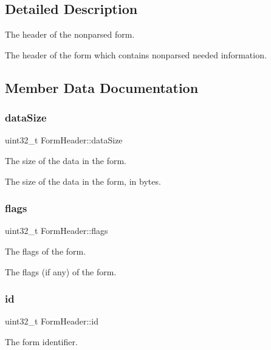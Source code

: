 \subsection{Detailed Description}
The header of the nonparsed form. 

The header of the form which contains nonparsed needed information. 

\subsection{Member Data Documentation}
\mbox{\label{struct_form_header_a39628718fdb8e8825236f8d435bb723a}} 
\subsubsection{\texorpdfstring{data\+Size}{dataSize}}
{\footnotesize\ttfamily uint32\+\_\+t Form\+Header\+::data\+Size}



The size of the data in the form. 

The size of the data in the form, in bytes. \mbox{\label{struct_form_header_afdbca03050703e03f70e073ad1fda83f}} 
\subsubsection{\texorpdfstring{flags}{flags}}
{\footnotesize\ttfamily uint32\+\_\+t Form\+Header\+::flags}



The flags of the form. 

The flags (if any) of the form. \mbox{\label{struct_form_header_a848f4bb1320b2c08b8d865151ccd8ee3}} 
\subsubsection{\texorpdfstring{id}{id}}
{\footnotesize\ttfamily uint32\+\_\+t Form\+Header\+::id}



The form identifier. 

